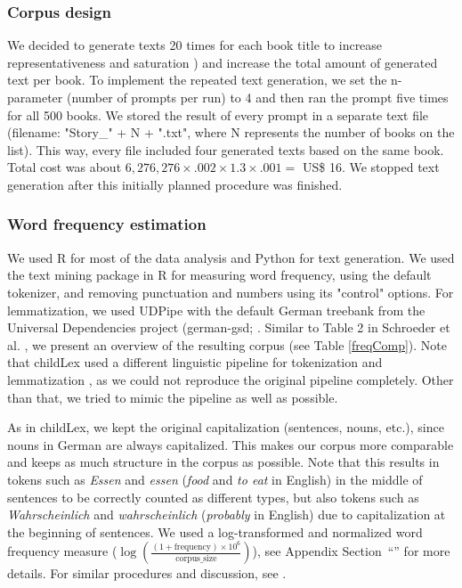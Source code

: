 \documentclass[manuscript]{stjour}
\begin{document}
\subsubsection*{Corpus design}

We decided to generate texts 20 times for each book title to increase representativeness and saturation  \citep[see ][]{schnell_understanding_2021}) and increase the total amount of generated text per book. To implement the repeated text generation, we set the n-parameter (number of prompts per run) to 4 and then ran the prompt five times for all 500 books. We stored the result of every prompt in a separate text file (filename: "Story\_" + N + ".txt", where N represents the number of books on the list). This way, every file included four generated texts based on the same book. Total cost was about $6,276,276 \times .002 \times 1.3 \times .001 =$ US\$ 16. We stopped text generation after this initially planned procedure was finished. 


\subsubsection*{Word frequency estimation}

We used R for most of the data analysis and Python for text generation. We used the text mining package in R \citep[tm; ][]{feinerer_text_2008} for measuring word frequency, using the default tokenizer, and removing punctuation and numbers using its "control" options. For lemmatization, we used UDPipe \citep{straka_tokenizing_2017} with the default German treebank from the Universal Dependencies project (german-gsd; \citep{mcdonald_universal_2013}. Similar to Table 2 in Schroeder et al. \citep{schroeder_childlex_2015}, we present an overview of the resulting corpus (see Table \ref{freqComp}). Note that childLex used a different linguistic pipeline for tokenization and lemmatization \citep[i.e., based on][]{jurish_word_2013, yli-jyra_tagh_2006}, as we could not reproduce the original pipeline completely. Other than that, we tried to mimic the pipeline as well as possible. 

As in childLex, we kept the original capitalization (sentences, nouns, etc.), since nouns in German are always capitalized. This makes our corpus more comparable and keeps as much structure in the corpus as possible. Note that this results in tokens such as \textit{Essen} and \textit{essen} (\textit{food} and \textit{to eat} in English) in the middle of sentences to be correctly counted as different types, but also tokens such as \textit{Wahrscheinlich} and \textit{wahrscheinlich} (\textit{probably} in English) due to capitalization at the beginning of sentences. 
We used a log-transformed and normalized word frequency measure ($\log\left(\frac{(1 + \text{frequency}) \times 10^6}{\text{corpus\_size}}\right)$), see Appendix Section~“” for more details. For similar procedures and discussion, see \citet{heister_dlexdb_2011, van_heuven_subtlex-uk_2014}.
\end{document}
